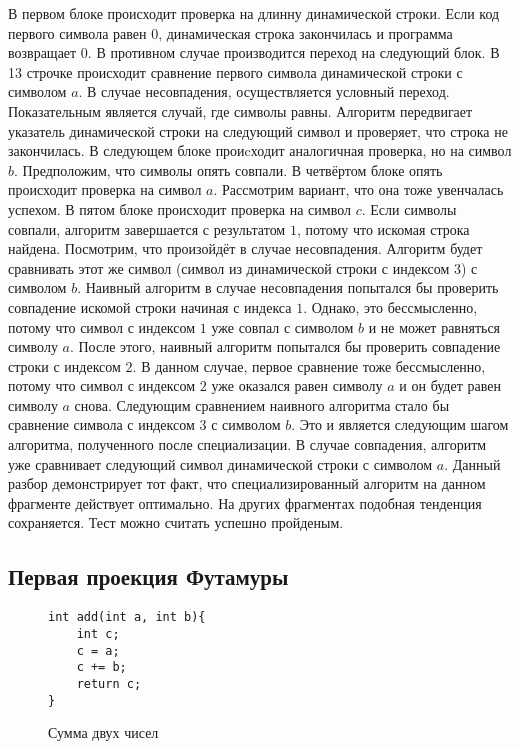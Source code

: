В первом блоке происходит проверка на длинну динамической строки. Если код первого символа равен $0$, динамическая строка закончилась и программа возвращает $0$. В противном случае производится переход на следующий блок. В 13 строчке происходит сравнение первого символа динамической строки с символом $a$. В случае несовпадения, осуществляется условный переход. Показательным является случай, где символы равны. Алгоритм передвигает указатель динамической строки на следующий символ и проверяет, что строка не закончилась. В следующем блоке проиcходит аналогичная проверка, но на символ $b$. Предположим, что символы опять совпали. В четвёртом блоке опять происходит проверка на символ $a$. Рассмотрим вариант, что она тоже увенчалась успехом. В пятом блоке происходит проверка на символ $c$. Если символы совпали, алгоритм завершается с результатом $1$, потому что искомая строка найдена. Посмотрим, что произойдёт в случае несовпадения. Алгоритм будет сравнивать этот же символ (символ из динамической строки с индексом 3) с символом $b$. Наивный алгоритм в случае несовпадения попытался бы проверить совпадение искомой строки начиная с индекса $1$. Однако, это бессмысленно, потому что символ с индексом $1$ уже совпал с символом $b$ и не может равняться символу $a$. После этого, наивный алгоритм попытался бы проверить совпадение строки с индексом $2$. В данном случае, первое сравнение тоже бессмысленно, потому что символ с индексом $2$ уже оказался равен символу $a$ и он будет равен символу $a$ снова. Следующим сравнением наивного алгоритма стало бы сравнение символа с индексом $3$ с символом $b$. Это и является следующим шагом алгоритма, полученного после специализации. В случае совпадения, алгоритм уже сравнивает следующий символ динамической строки с символом $a$. Данный разбор демонстрирует тот факт, что специализированный алгоритм на данном фрагменте действует оптимально. На других фрагментах подобная тенденция сохраняется. Тест можно считать успешно пройденым.

\subsection{ Первая проекция Футамуры}

\begin{wrapfigure}{r}{0.4\textwidth}
\begin{lstlisting}[xleftmargin = 20pt]
int add(int a, int b){
    int c;
    c = a;
    c += b;
    return c;
}
\end{lstlisting}
\caption{ Сумма двух чисел}
\label{fig:add}
\end{wrapfigure}

